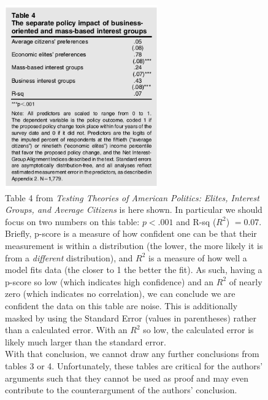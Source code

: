 \documentclass[]{article}
\begin{document}
\begin{figure}[H]
	\begin{center}
		\includegraphics[height=300px]{./figures/paper/economic-table4.png}
	\end{center}	
	\caption{Table 4 from \textit{Testing Theories of American Politics: Elites, Interest Groups, and Average Citizens} is here shown. In particular we should focus on two numbers on this table: $p < .001$ and R-sq ($R^2$) $= 0.07$. Briefly, p-score is a measure of how confident one can be that their measurement is within a distribution (the lower, the more likely it is from a \textit{different} distribution), and $R^2$ is a measure of how well a model fits data (the closer to 1 the better the fit). As such, having a p-score so low (which indicates high confidence) and an $R^2$ of nearly zero (which indicates no correlation), we can conclude we are confident the data on this table are noise. This is additionally masked by using the Standard Error (values in parentheses) rather than a calculated error. With an $R^2$ so low, the calculated error is likely much larger than the standard error. \\With that conclusion, we cannot draw any further conclusions from tables 3 or 4. Unfortunately, these tables are critical for the authors' arguments such that they cannot be used as proof and may even contribute to the counterargument of the authors' conclusion.}
	\label{paper_table4}
\end{figure}
\end{document}
